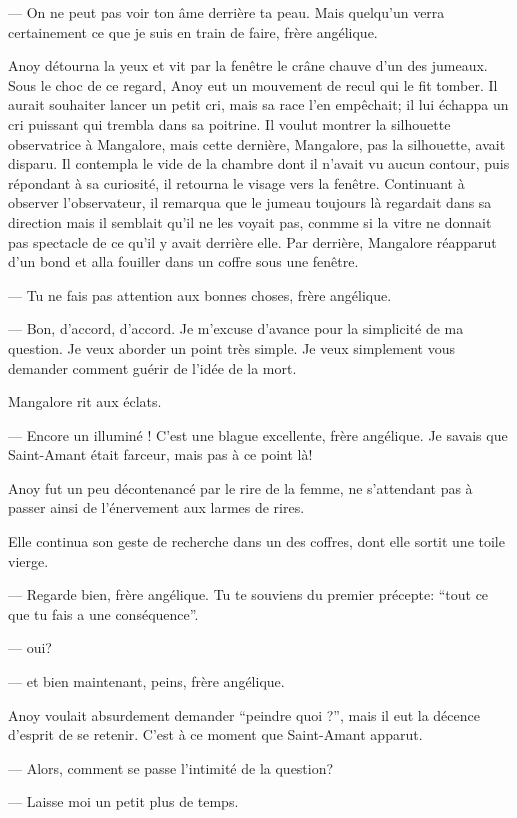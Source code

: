 --- On ne peut pas voir ton âme derrière ta peau. Mais quelqu'un verra
certainement ce que je suis en train de faire, frère angélique.

Anoy détourna la yeux et vit par la fenêtre le crâne chauve d'un des
jumeaux. Sous le choc de ce regard, Anoy eut un mouvement de recul qui
le fit tomber. Il aurait souhaiter lancer un petit cri, mais sa race
l'en empêchait; il lui échappa un cri puissant qui trembla dans sa
poitrine. Il voulut montrer la silhouette observatrice à Mangalore,
mais cette dernière, Mangalore, pas la silhouette, avait disparu. Il
contempla le vide de la chambre dont il n'avait vu aucun contour, puis
répondant à sa curiosité, il retourna le visage vers la
fenêtre. Continuant à observer l'observateur, il remarqua que le
jumeau toujours là regardait dans sa direction mais il semblait qu'il
ne les voyait pas, conmme si la vitre ne donnait pas spectacle de ce
qu'il y avait derrière elle. Par derrière, Mangalore réapparut d'un
bond et alla fouiller dans un coffre sous une fenêtre.

--- Tu ne fais pas attention aux bonnes choses, frère angélique.

--- Bon, d'accord, d'accord. Je m'excuse d'avance pour la simplicité
de ma question. Je veux aborder un point très simple. Je veux
simplement vous demander comment guérir de l'idée de la mort.

Mangalore rit aux éclats. 

--- Encore un illuminé ! C'est une blague excellente, frère
angélique. Je savais que Saint-Amant était farceur, mais pas à ce
point là!

Anoy fut un peu décontenancé par le rire de la femme, ne s'attendant
pas à passer ainsi de l'énervement aux larmes de rires.

Elle continua son geste de recherche dans un des coffres, dont elle
sortit une toile vierge.

--- Regarde bien, frère angélique. Tu te souviens du premier précepte:
``tout ce que tu fais a une conséquence''.

--- oui?

--- et bien maintenant, peins, frère angélique.

Anoy voulait absurdement demander ``peindre quoi ?'', mais il eut la
décence d'esprit de se retenir. C'est à ce moment que Saint-Amant
apparut.

--- Alors, comment se passe l'intimité de la question?

--- Laisse moi un petit plus de temps.

